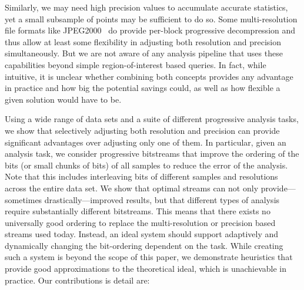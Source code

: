                        Similarly, we may need high precision values to
                       accumulate accurate statistics, yet a small subsample of points may be
                       sufficient to do so.
                               Some multi-resolution file formats like JPEG2000~\cite{jpeg2001} do
provide per-block progressive decompression and thus allow at least some
flexibility
in adjusting both resolution and precision simultaneously. But we are
not aware of any analysis pipeline that uses these capabilities beyond
simple region-of-interest based queries. In fact, while intuitive, it
is unclear whether combining both concepts provides any
advantage in practice and how big the potential savings could, as well as
how flexible a given solution would have to be.

Using a wide range of data sets and a suite of different progressive analysis
tasks, we show that selectively adjusting both resolution and precision can
provide significant advantages over adjusting only one of them. In
particular, given an analysis task, we consider progressive
bitstreams that improve the ordering of the bits (or small chunks of bits)
of all samples to reduce the error of the analysis. Note that this includes
interleaving bits of different samples and resolutions across the entire
data set. We show that optimal streams can not only provide---sometimes
drastically---improved results, but that different types of
analysis require substantially different bitstreams. This means that
there exists no universally good ordering to replace the
multi-resolution or precision based streams used today.
Instead, an
ideal system should support adaptively and dynamically changing the
bit-ordering dependent on the task.
While creating such a system is
beyond the scope of this paper, we demonstrate heuristics that provide
good approximations to the theoretical ideal, which is unachievable in
practice. Our contributions is detail are:

